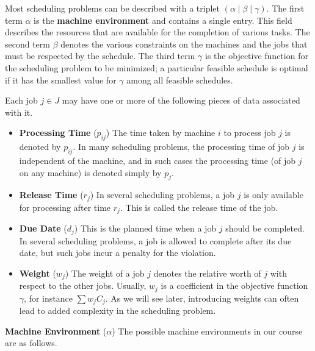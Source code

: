 Most scheduling problems can be described with a triplet $(\alpha \mid 
\beta \mid \gamma)$. The first term $\alpha$ is the {\bf machine environment}
and contains a single entry. This field describes the resources that are 
available for the completion of various tasks. The second term $\beta$ 
denotes the various constraints on the machines and the jobs that must be 
respected by the schedule. The third term $\gamma$ is the objective function 
for the scheduling problem to be minimized; a particular feasible schedule 
is optimal if it has the smallest value for $\gamma$ among all feasible 
schedules. 

Each job $j \in J$ may have one or more of the following pieces of data 
associated with it. 

\begin{itemize}

    \item {\bf Processing Time} ($p_{ij}$) The time taken by machine $i$ 
    to process job $j$ is denoted by $p_{ij}$. In many scheduling problems, 
    the processing time of job $j$ is independent of the machine, and in 
    such cases the processing time (of job $j$ on any machine) is denoted
    simply by $p_j$.

    \item {\bf Release Time} ($r_j$) In several scheduling problems, a job 
    $j$ is only available for processing after time $r_j$. This is called 
    the release time of the job.

    \item {\bf Due Date} ($d_j$) This is the planned time when a job $j$ 
    should be completed. In several scheduling problems, a job is allowed 
    to complete after its due date, but such jobs incur a penalty for the 
    violation.

    \item {\bf Weight} ($w_j$) The weight of a job $j$ denotes the relative 
    worth of $j$ with respect to the other jobs. Usually, $w_j$ is a 
    coefficient in the objective function $\gamma$, for instance 
    $\sum w_j C_j$. As we will see later, introducing weights can often lead 
    to added complexity in the scheduling problem.

\end{itemize}

{\bf Machine Environment} ($\alpha$) The possible machine environments 
in our course are as follows.

